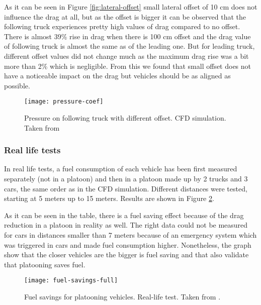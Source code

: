 % 
As it can be seen in Figure \ref{fig:lateral-offset} small lateral offset of 10 cm does not influence the drag at all, but as the offset is bigger it can be observed that the following truck experiences pretty high values of drag compared to no offset. There is almost 39\% rise in drag when there is 100 cm offset and the drag value of following truck is almost the same as of the leading one. But for leading truck, different offset values did not change much as the maximum drag rise was a bit more than 2\% which is negligible. From this we found that small offset does not have a noticeable impact on the drag but vehicles should be as aligned as possible.\par
%
\begin{figure}[p]
    \centering
    \texttt{[image: pressure-coef]}
    \caption{Pressure on following truck with different offset. CFD simulation. Taken from \cite[p. 19]{Laxhammar2015CooperativeConsumption}}
    \label{fig:pressure-coef}
\end{figure}
% 
% 
\subsubsection*{Real life tests}
In real life tests, a fuel consumption of each vehicle has been first measured separately (not in a platoon) and then in a platoon made up by 2 trucks and 3 cars, the same order as in the CFD simulation. Different distances were tested, starting at 5 meters up to 15 meters. Results are shown in Figure \ref{fig:fuel-savings-full}.\par
% 
As it can be seen in the table, there is a fuel saving effect because of the drag reduction in a platoon in reality as well. The right data could not be measured for cars in distances smaller than 7 meters because of an emergency system which was triggered in cars and made fuel consumption higher. Nonetheless, the graph show that the closer vehicles are the bigger is fuel saving and that also validate that platooning saves fuel.
% 
\begin{figure}[h]
    \centering
    \texttt{[image: fuel-savings-full]}
    \caption{Fuel savings for platooning vehicles. Real-life test. Taken from \cite[p. 36]{Chan2012ProjectSARTRE}.}
    \label{fig:fuel-savings-full}
\end{figure}
% 
